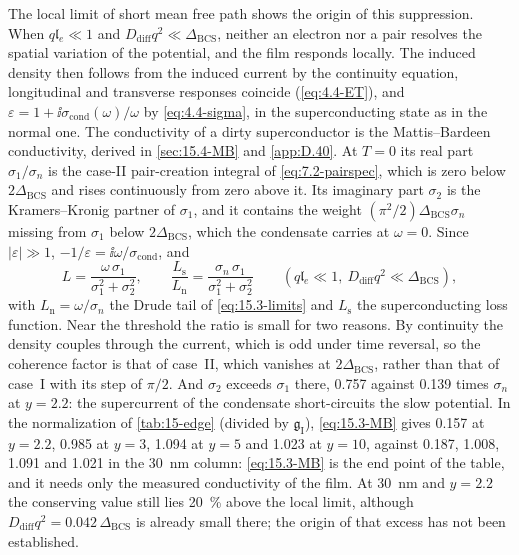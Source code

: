 The local limit of short mean free path shows the origin of this suppression. When $q\mathfrak{l}_e \ll 1$ and $D_{\mathrm{diff}}q^2 \ll \Delta_{\mathrm{BCS}}$, neither an electron nor a pair resolves the spatial variation of the potential, and the film responds locally. The induced density then follows from the induced current by the continuity equation, longitudinal and transverse responses coincide (\cref{eq:4.4-ET}), and $\varepsilon = 1 + \ii\sigma_{\mathrm{cond}}(\omega)/\omega$ by \cref{eq:4.4-sigma}, in the superconducting state as in the normal one. The conductivity of a dirty superconductor is the Mattis--Bardeen conductivity, derived in \cref{sec:15.4-MB} and \cref{app:D.40}. At $T = 0$ its real part $\sigma_1/\sigma_n$ is the case-II pair-creation integral of \cref{eq:7.2-pairspec}, which is zero below $2\Delta_{\mathrm{BCS}}$ and rises continuously from zero above it. Its imaginary part $\sigma_2$ is the Kramers--Kronig partner of $\sigma_1$, and it contains the weight $(\pi^2/2)\Delta_{\mathrm{BCS}}\sigma_n$ missing from $\sigma_1$ below $2\Delta_{\mathrm{BCS}}$, which the condensate carries at $\omega = 0$. Since $|\varepsilon| \gg 1$, $-1/\varepsilon = \ii\omega/\sigma_{\mathrm{cond}}$, and
\begin{equation}
  L = \frac{\omega\,\sigma_1}{\sigma_1^2 + \sigma_2^2}, \qquad
  \frac{L_{\mathrm{s}}}{L_{\mathrm{n}}} = \frac{\sigma_n\,\sigma_1}{\sigma_1^2 + \sigma_2^2} \qquad (q\mathfrak{l}_e \ll 1,\ D_{\mathrm{diff}}q^2 \ll \Delta_{\mathrm{BCS}}) ,
  \label{eq:15.3-MB}
\end{equation}
with $L_{\mathrm{n}} = \omega/\sigma_n$ the Drude tail of \cref{eq:15.3-limits} and $L_{\mathrm{s}}$ the superconducting loss function. Near the threshold the ratio is small for two reasons. By continuity the density couples through the current, which is odd under time reversal, so the coherence factor is that of case~II, which vanishes at $2\Delta_{\mathrm{BCS}}$, rather than that of case~I with its step of $\pi/2$. And $\sigma_2$ exceeds $\sigma_1$ there, 0.757 against 0.139 times $\sigma_n$ at $y = 2.2$: the supercurrent of the condensate short-circuits the slow potential. In the normalization of \cref{tab:15-edge} (divided by $\mathfrak{g}_{\mathrm{I}}$), \cref{eq:15.3-MB} gives 0.157 at $y = 2.2$, 0.985 at $y = 3$, 1.094 at $y = 5$ and 1.023 at $y = 10$, against 0.187, 1.008, 1.091 and 1.021 in the \SI{30}{nm} column: \cref{eq:15.3-MB} is the end point of the table, and it needs only the measured conductivity of the film. At \SI{30}{nm} and $y = 2.2$ the conserving value still lies \SI{20}{\percent} above the local limit, although $D_{\mathrm{diff}}q^2 = 0.042\,\Delta_{\mathrm{BCS}}$ is already small there; the origin of that excess has not been established.

